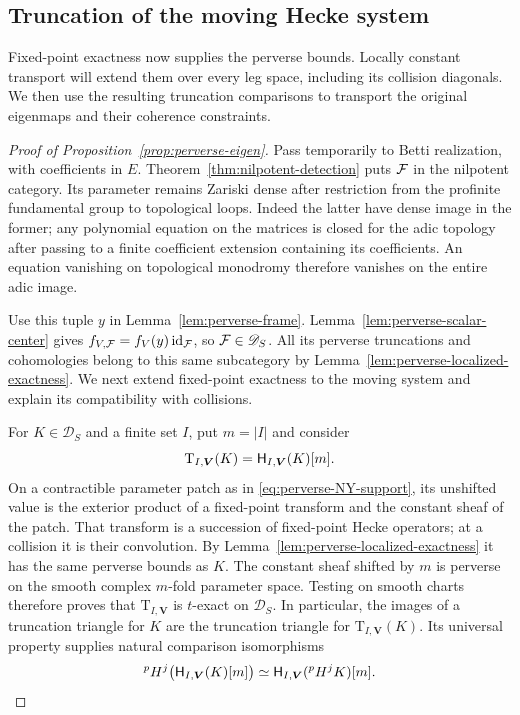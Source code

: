 \subsection{Truncation of the moving Hecke system}

Fixed-point exactness now supplies the perverse bounds.  Locally constant
transport will extend them over every leg space, including its collision
diagonals.  We then use the resulting truncation comparisons to transport
the original eigenmaps and their coherence constraints.

\begin{proof}[Proof of Proposition~\ref{prop:perverse-eigen}]
Pass temporarily to Betti realization, with coefficients in $E$.
Theorem~\ref{thm:nilpotent-detection} puts $\mathcal F$ in the nilpotent
category.  Its parameter remains Zariski dense after restriction
from the profinite fundamental group to topological loops.  Indeed
the latter have dense image in the former; any polynomial equation
on the matrices is closed for the adic topology after passing to a
finite coefficient extension containing its coefficients.  An
equation vanishing on topological monodromy therefore vanishes on
the entire adic image.

Use this tuple $y$ in Lemma~\ref{lem:perverse-frame}.
Lemma~\ref{lem:perverse-scalar-center} gives
$f_{V,\mathcal F}=f_V(y)\operatorname{id}_{\mathcal F}$, so $\mathcal F\in\mathscr D_S$.
All its perverse truncations and cohomologies belong to this same
subcategory by Lemma~\ref{lem:perverse-localized-exactness}.
We next extend fixed-point exactness to the moving system and
explain its compatibility with collisions.

For $K\in\mathscr D_S$ and a finite set $I$, put $m=|I|$ and consider
\[
 \mathrm T_{I,\boldsymbol V}(K)
       =\mathsf H_{I,\boldsymbol V}(K)[m].
\]
On a contractible parameter patch as in
\eqref{eq:perverse-NY-support}, its unshifted value is the exterior
product of a fixed-point transform and the constant sheaf of the
patch.  That transform is a succession of fixed-point Hecke
operators; at a collision it is their convolution.  By
Lemma~\ref{lem:perverse-localized-exactness} it has the same
perverse bounds as $K$.  The constant sheaf shifted by $m$ is
perverse on the smooth complex $m$-fold parameter space.  Testing
on smooth charts therefore proves that
$\mathrm T_{I,\boldsymbol V}$ is $t$-exact on $\mathscr D_S$.
In particular, the images of a truncation triangle for $K$ are
the truncation triangle for $\mathrm T_{I,\boldsymbol V}(K)$.
Its universal property supplies natural comparison isomorphisms
\begin{equation}\label{eq:perverse-moving-truncation}
 {}^pH^j\bigl(\mathsf H_{I,\boldsymbol V}(K)[m]\bigr)
     \simeq \mathsf H_{I,\boldsymbol V}({}^pH^jK)[m].
\end{equation}


\end{proof}
